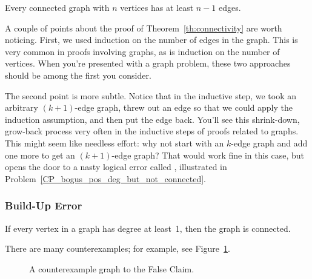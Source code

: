 \begin{corollary}
\label{cor:n-1}
Every connected graph with $n$ vertices has at least $n - 1$ edges.
\end{corollary}

A couple of points about the proof of Theorem~\ref{th:connectivity}
are worth noticing.  First, we used induction on the number of edges
in the graph.  This is very common in proofs involving graphs, as is
induction on the number of vertices.  When you're presented with a
graph problem, these two approaches should be among the first you
consider.

The second point is more subtle.  Notice that in the inductive step,
we took an arbitrary $(k+1)$-edge graph, threw out an edge so that we
could apply the induction assumption, and then put the edge back.
You'll see this shrink-down, grow-back process very often in the
inductive steps of proofs related to graphs.  This might seem like
needless effort: why not start with an $k$-edge graph and add one more
to get an $(k+1)$-edge graph?  That would work fine in this case, but
opens the door to a nasty logical error called ,
illustrated in Problem~\ref{CP_bogus_pos_deg_but_not_connected}.

\iffalse

\subsubsection{Build-Up Error}

\begin{falseclm*}
If every vertex in a graph has degree at least~1, then the graph is
connected.
\end{falseclm*}

There are many counterexamples; for example, see Figure~\ref{fig:5Z}.

\begin{figure}


\caption{A counterexample graph to the False Claim.}

\label{fig:5Z}
\end{figure}

